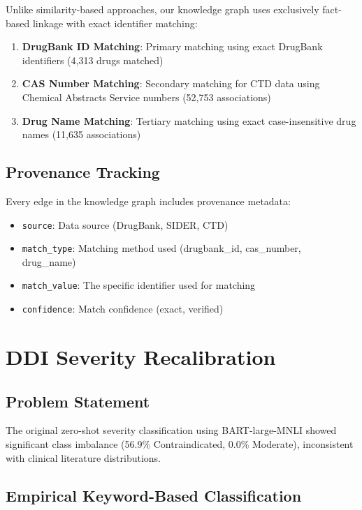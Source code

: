 \documentclass[11pt]{article}
\begin{document}
Unlike similarity-based approaches, our knowledge graph uses exclusively fact-based linkage with exact identifier matching:

\begin{enumerate}
    \item \textbf{DrugBank ID Matching}: Primary matching using exact DrugBank identifiers (4,313 drugs matched)
    \item \textbf{CAS Number Matching}: Secondary matching for CTD data using Chemical Abstracts Service numbers (52,753 associations)
    \item \textbf{Drug Name Matching}: Tertiary matching using exact case-insensitive drug names (11,635 associations)
\end{enumerate}

\subsection{Provenance Tracking}

Every edge in the knowledge graph includes provenance metadata:
\begin{itemize}
    \item \texttt{source}: Data source (DrugBank, SIDER, CTD)
    \item \texttt{match\_type}: Matching method used (drugbank\_id, cas\_number, drug\_name)
    \item \texttt{match\_value}: The specific identifier used for matching
    \item \texttt{confidence}: Match confidence (exact, verified)
\end{itemize}

\section{DDI Severity Recalibration}

\subsection{Problem Statement}

The original zero-shot severity classification using BART-large-MNLI showed significant class imbalance (56.9\% Contraindicated, 0.0\% Moderate), inconsistent with clinical literature distributions.

\subsection{Empirical Keyword-Based Classification}
\end{document}
